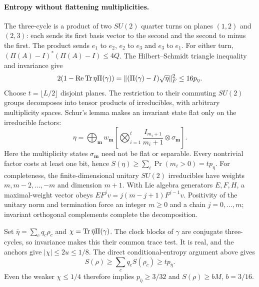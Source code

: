 \paragraph{Entropy without flattening multiplicities.}
The three-cycle is a product of two $SU(2)$ quarter turns on planes
$(1,2)$ and $(2,3)$: each sends its first basis vector to the second
and the second to minus the first. The product sends $e_1$ to $e_2$,
$e_2$ to $e_3$ and $e_3$ to $e_1$.
For either turn, $(\Pi(A)-I)^*(\Pi(A)-I)\leq4Q$.
The Hilbert--Schmidt triangle inequality and invariance give
\[
 2(1-\operatorname{Re}\operatorname{Tr}\eta\Pi(\gamma))
 =\lVert (\Pi(\gamma)-I)\sqrt\eta\rVert_F^2\leq16p_\eta.
\]
Choose $t=\lfloor L/2\rfloor$ disjoint planes. The restriction to
their commuting $SU(2)$ groups decomposes into tensor products of
irreducibles, with arbitrary multiplicity spaces. Schur's lemma
makes an invariant state flat only on the irreducible factors:
\[
 \eta=\bigoplus_{\mathbf m}w_{\mathbf m}
 \left[\bigotimes_{i=1}^t\frac{I_{m_i+1}}{m_i+1}
                  \otimes\sigma_{\mathbf m}\right].
\]
Here the multiplicity states $\sigma_{\mathbf m}$ need not be flat
or separable. Every nontrivial factor costs at least one bit, hence
$S(\eta)\geq\sum_i\Pr(m_i>0)=tp_\eta$.
For completeness, the finite-dimensional unitary $SU(2)$ irreducibles
have weights $m,m-2,\ldots,-m$ and dimension $m+1$.
With Lie algebra generators $E,F,H$, a maximal-weight vector obeys
$EF^jv=j(m-j+1)F^{j-1}v$. Positivity of the unitary norm and termination
force an integer $m\geq0$ and a chain $j=0,\ldots,m$; invariant
orthogonal complements complete the decomposition.

Set $\bar\eta=\sum_cq_c\rho_c$ and
$\chi=\operatorname{Tr}\bar\eta\Pi(\gamma)$. The clock blocks of $\gamma$ are
conjugate three-cycles, so invariance makes this their common trace
test. It is real, and the anchors give $|\chi|\leq2u\leq1/8$.
The direct conditional-entropy argument above gives
\[
 S(\rho)\geq\sum_cq_cS(\rho_c)
       \geq t p_{\bar\eta}.
\]
Even the weaker $\chi\leq1/4$ therefore implies
$p_{\bar\eta}\geq3/32$ and $S(\rho)\geq bM$, $b=3/16$.

